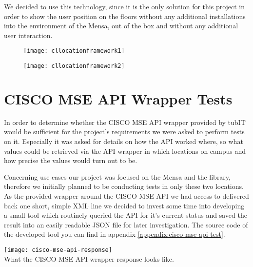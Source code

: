 We decided to use this technology, since it is the only solution for this project in order to show the user position on the floors without any additional installations into the environment of the Mensa, out of the box and without any additional user interaction.

\begin{figure}
\centering
\begin{minipage}{.5\textwidth}
  \centering
  \texttt{[image: cllocationframework1]}
  \label{fig:cllocationframework1}
\end{minipage}%
\begin{minipage}{.5\textwidth}
  \centering
  \texttt{[image: cllocationframework2]}
  \label{fig:cllocationframework2}
\end{minipage}
\end{figure}


\vspace{0.5cm}

\section{CISCO MSE API Wrapper Tests}

In order to determine whether the CISCO MSE API wrapper provided by tubIT would be sufficient for the project's requirements we were asked to perform tests on it. Especially it was asked for details on how the API worked where, so what values could be retrieved via the API wrapper in which locations on campus and how precise the values would turn out to be.

Concerning use cases our project was focused on the Mensa and the library, therefore we initially planned to be conducting tests in only these two locations. As the provided wrapper around the CISCO MSE API we had access to delivered back one short, simple XML line we decided to invest some time into developing a small tool which routinely queried the API for it's current status and saved the result into an easily readable JSON file for later investigation. The source code of the developed tool you can find in appendix \ref{appendix:cisco-mse-api-test}.

\begin{center}
    \texttt{[image: cisco-mse-api-response]}\\
    What the CISCO MSE API wrapper response looks like.
\end{center}

